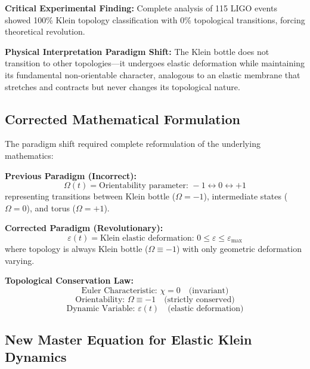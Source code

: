 \documentclass[12pt]{iopart}
\begin{document}
\textbf{Critical Experimental Finding:} Complete analysis of 115 LIGO events showed 100\% Klein topology classification with 0\% topological transitions, forcing theoretical revolution.

\textbf{Physical Interpretation Paradigm Shift:}
The Klein bottle does not transition to other topologies—it undergoes elastic deformation while maintaining its fundamental non-orientable character, analogous to an elastic membrane that stretches and contracts but never changes its topological nature.

\subsection{Corrected Mathematical Formulation}

The paradigm shift required complete reformulation of the underlying mathematics:

\textbf{Previous Paradigm (Incorrect):}
\begin{equation}
\Omega(t) = \text{Orientability parameter: } -1 \leftrightarrow 0 \leftrightarrow +1
\end{equation}
representing transitions between Klein bottle ($\Omega = -1$), intermediate states ($\Omega = 0$), and torus ($\Omega = +1$).

\textbf{Corrected Paradigm (Revolutionary):}
\begin{equation}
\varepsilon(t) = \text{Klein elastic deformation: } 0 \leq \varepsilon \leq \varepsilon_{\max}
\end{equation}
where topology is always Klein bottle ($\Omega \equiv -1$) with only geometric deformation varying.

\textbf{Topological Conservation Law:}
\begin{equation}
\text{Euler Characteristic: } \chi = 0 \quad \text{(invariant)}
\end{equation}
\begin{equation}
\text{Orientability: } \Omega \equiv -1 \quad \text{(strictly conserved)}
\end{equation}
\begin{equation}
\text{Dynamic Variable: } \varepsilon(t) \quad \text{(elastic deformation)}
\end{equation}

\subsection{New Master Equation for Elastic Klein Dynamics}
\end{document}
